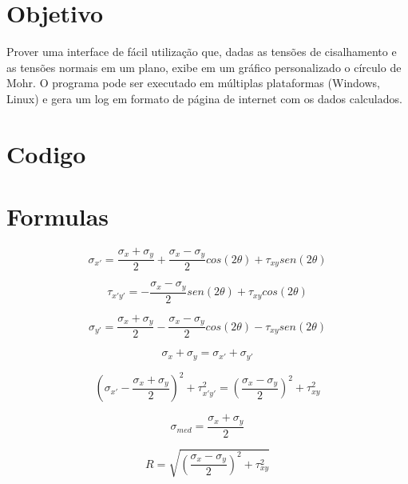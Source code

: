 \documentclass[a4paper]{article}
\begin{document}
\section{Objetivo}
Prover uma interface de fácil utilização que, dadas as tensões de cisalhamento e as tensões normais em um plano, exibe em um gráfico personalizado o círculo de Mohr. O programa pode ser executado em múltiplas plataformas (Windows, Linux) e gera um log em formato de página de internet com os dados calculados. 

\section{Codigo}


\section{Formulas}

\begin{equation}
	\label{sigma_x'}
	\sigma_{x'} = \frac{\sigma_x + \sigma_y}{2} + \frac{\sigma_x - \sigma_y}{2}cos(2 \theta) + \tau_{xy}sen(2\theta)
\end{equation}

\begin{equation}
	\label{tau_xy'}	
	\tau_{x'y'} = -\frac{\sigma_x - \sigma_y}{2}sen(2 \theta) + \tau_{xy}cos(2\theta)
\end{equation}

\begin{equation}
	\label{sigma_y'}
	\sigma_{y'} = \frac{\sigma_x + \sigma_y}{2} - \frac{\sigma_x - \sigma_y}{2}cos(2 \theta) - \tau_{xy}sen(2\theta)
\end{equation}

\begin{equation}
	\sigma_x + \sigma_y = \sigma_{x'} + \sigma_{y'}
\end{equation}

\begin{equation}
	(\sigma_{x'} - \frac{\sigma_x + \sigma_y}{2})^2 + \tau_{x'y'}^2 = (\frac{\sigma_x - \sigma_y}{2})^2 + \tau_{xy}^2
\end{equation}

\begin{equation}
	\sigma_{med} = \frac{\sigma_x + \sigma_y}{2} 
\end{equation}

\begin{equation}
	R =  \sqrt{(\frac{\sigma_x - \sigma_y}{2})^2 + \tau_{xy}^2}  
\end{equation}
\end{document}
